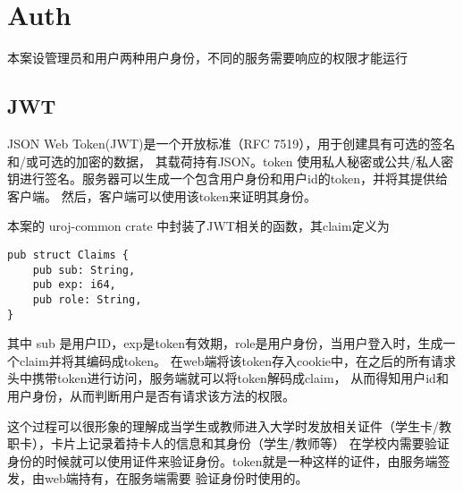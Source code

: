 \section{Auth}
本案设管理员和用户两种用户身份，不同的服务需要响应的权限才能运行
\subsection{JWT}
JSON Web Token(JWT)是一个开放标准（RFC 7519），用于创建具有可选的签名和/或可选的加密的数据，
其载荷持有JSON。token 使用私人秘密或公共/私人密钥进行签名。服务器可以生成一个包含用户身份和用户id的token，并将其提供给客户端。
然后，客户端可以使用该token来证明其身份。

本案的 uroj-common crate 中封装了JWT相关的函数，其claim定义为
\begin{lstlisting}
pub struct Claims {
    pub sub: String,
    pub exp: i64,
    pub role: String,
}
\end{lstlisting}

其中 sub 是用户ID，exp是token有效期，role是用户身份，当用户登入时，生成一个claim并将其编码成token。
在web端将该token存入cookie中，在之后的所有请求头中携带token进行访问，服务端就可以将token解码成claim，
从而得知用户id和用户身份，从而判断用户是否有请求该方法的权限。

这个过程可以很形象的理解成当学生或教师进入大学时发放相关证件（学生卡/教职卡），卡片上记录着持卡人的信息和其身份（学生/教师等）
在学校内需要验证身份的时候就可以使用证件来验证身份。token就是一种这样的证件，由服务端签发，由web端持有，在服务端需要
验证身份时使用的。